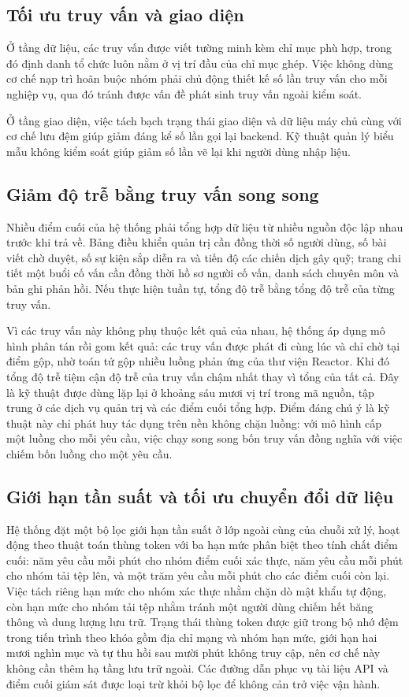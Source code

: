 \documentclass[12pt,a4paper,oneside]{report}
\begin{document}
\subsection{Tối ưu truy vấn và giao diện}

Ở tầng dữ liệu, các truy vấn được viết tường minh kèm chỉ mục phù hợp, trong đó định danh tổ chức luôn nằm ở vị trí đầu của chỉ mục ghép. Việc không dùng cơ chế nạp trì hoãn buộc nhóm phải chủ động thiết kế số lần truy vấn cho mỗi nghiệp vụ, qua đó tránh được vấn đề phát sinh truy vấn ngoài kiểm soát.

Ở tầng giao diện, việc tách bạch trạng thái giao diện và dữ liệu máy chủ cùng với cơ chế lưu đệm giúp giảm đáng kể số lần gọi lại backend. Kỹ thuật quản lý biểu mẫu không kiểm soát giúp giảm số lần vẽ lại khi người dùng nhập liệu.

\subsection{Giảm độ trễ bằng truy vấn song song}

Nhiều điểm cuối của hệ thống phải tổng hợp dữ liệu từ nhiều nguồn độc lập nhau trước khi trả về. Bảng điều khiển quản trị cần đồng thời số người dùng, số bài viết chờ duyệt, số sự kiện sắp diễn ra và tiến độ các chiến dịch gây quỹ; trang chi tiết một buổi cố vấn cần đồng thời hồ sơ người cố vấn, danh sách chuyên môn và bản ghi phản hồi. Nếu thực hiện tuần tự, tổng độ trễ bằng tổng độ trễ của từng truy vấn.

Vì các truy vấn này không phụ thuộc kết quả của nhau, hệ thống áp dụng mô hình phân tán rồi gom kết quả: các truy vấn được phát đi cùng lúc và chỉ chờ tại điểm gộp, nhờ toán tử gộp nhiều luồng phản ứng của thư viện Reactor. Khi đó tổng độ trễ tiệm cận độ trễ của truy vấn chậm nhất thay vì tổng của tất cả. Đây là kỹ thuật được dùng lặp lại ở khoảng sáu mươi vị trí trong mã nguồn, tập trung ở các dịch vụ quản trị và các điểm cuối tổng hợp. Điểm đáng chú ý là kỹ thuật này chỉ phát huy tác dụng trên nền không chặn luồng: với mô hình cấp một luồng cho mỗi yêu cầu, việc chạy song song bốn truy vấn đồng nghĩa với việc chiếm bốn luồng cho một yêu cầu.

\subsection{Giới hạn tần suất và tối ưu chuyển đổi dữ liệu}

Hệ thống đặt một bộ lọc giới hạn tần suất ở lớp ngoài cùng của chuỗi xử lý, hoạt động theo thuật toán thùng token với ba hạn mức phân biệt theo tính chất điểm cuối: năm yêu cầu mỗi phút cho nhóm điểm cuối xác thực, năm yêu cầu mỗi phút cho nhóm tải tệp lên, và một trăm yêu cầu mỗi phút cho các điểm cuối còn lại. Việc tách riêng hạn mức cho nhóm xác thực nhằm chặn dò mật khẩu tự động, còn hạn mức cho nhóm tải tệp nhằm tránh một người dùng chiếm hết băng thông và dung lượng lưu trữ. Trạng thái thùng token được giữ trong bộ nhớ đệm trong tiến trình theo khóa gồm địa chỉ mạng và nhóm hạn mức, giới hạn hai mươi nghìn mục và tự thu hồi sau mười phút không truy cập, nên cơ chế này không cần thêm hạ tầng lưu trữ ngoài. Các đường dẫn phục vụ tài liệu API và điểm cuối giám sát được loại trừ khỏi bộ lọc để không cản trở việc vận hành.
\end{document}
